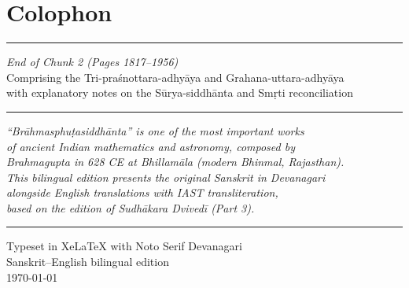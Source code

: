 \documentclass[11pt,a4paper]{article}
\newcommand{\shortline}{\noindent\rule{0.5\textwidth}{0.4pt}\par}
\begin{document}
\vspace{1cm}

\newpage
\section*{Colophon}

\begin{center}
\shortline
\vspace{0.5cm}

{\large\textit{End of Chunk 2 (Pages 1817--1956)}}\\[0.3cm]
{\small Comprising the Tri-pra\'snottara-adhyāya and Grahana-uttara-adhyāya}\\[0.3em]
{\small with explanatory notes on the Sūrya-siddhānta and Smṛti reconciliation}\\[0.5cm]

\shortline

\vspace{1cm}

{\small\textit{``Brāhmasphuṭasiddhānta'' is one of the most important works}}\\
{\small\textit{of ancient Indian mathematics and astronomy, composed by}}\\
{\small\textit{Brahmagupta in 628 CE at Bhillamāla (modern Bhinmal, Rajasthan).}}\\[0.5cm]

{\small\textit{This bilingual edition presents the original Sanskrit in Devanagari}}\\
{\small\textit{alongside English translations with IAST transliteration,}}\\
{\small\textit{based on the edition of Sudhākara Dvivedī (Part 3).}}\\[1cm]

\shortline

\vspace{0.5cm}
{\small Typeset in XeLaTeX with Noto Serif Devanagari}\\
{\small Sanskrit--English bilingual edition}\\
{\small \today}
\end{center}
\end{document}
